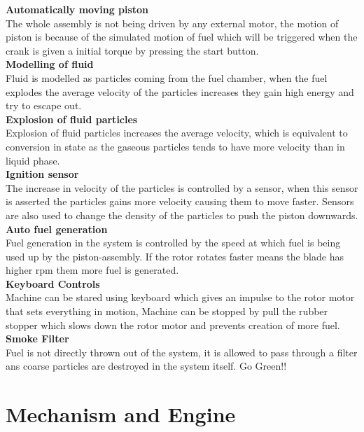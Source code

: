 \documentclass[12pt,a4paper]{report}
\begin{document}
\textbf{Automatically moving piston} \\
The whole assembly is not being driven by any external motor, the motion of piston is because of the simulated motion of fuel which will be triggered when the crank is given a initial torque by pressing the start button. 
\\ \linebreak
\textbf{Modelling of fluid} \\
Fluid is modelled as particles coming from the fuel chamber, when the fuel explodes the average velocity of the particles increases they gain high energy and try to escape out. 
\\ \linebreak
\textbf{Explosion of fluid particles} \\
 Explosion of fluid particles increases the average velocity, which is equivalent to conversion in state as the gaseous particles tends to have more velocity than in liquid phase. 
\cite{Sensor} 
 \\ \linebreak
\textbf{Ignition sensor} \\
The increase in velocity of the particles is controlled by a sensor, when this sensor is asserted the particles gains more velocity causing them to move faster. Sensors are also used to change the density of the particles to push the piston downwards. 
\cite{Sensor}
\\ \linebreak
\textbf{Auto fuel generation} \\
Fuel generation in the system is controlled by the speed at which fuel is being used up by the piston-assembly. If the rotor rotates faster means the blade has higher rpm them more fuel is generated. 
\\ \linebreak
\textbf{Keyboard Controls} \\
Machine can be stared using keyboard which gives an impulse to the rotor motor that sets everything in motion, Machine can be stopped by pull the rubber stopper which slows down the rotor motor and prevents creation of more fuel.
\\ \linebreak
\textbf{Smoke Filter}\\
Fuel is not directly thrown out of the system, it is allowed to pass through a filter ans coarse particles are destroyed in the system itself. Go Green!!
\pagebreak

\section*{Mechanism and Engine}
\end{document}
